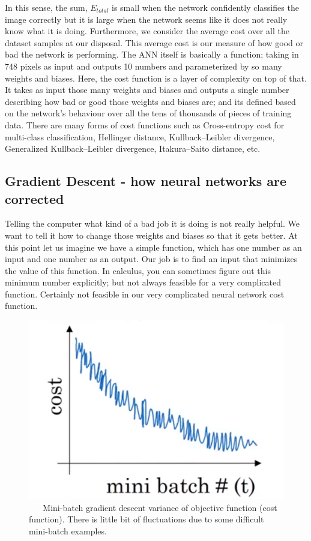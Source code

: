 \documentclass[master]{thesis-uestc}
\begin{document}
In this sense, the sum, $E_{total}$ is small when the network confidently classifies the image correctly but it is large when the network seems like it does not really know what it is doing. Furthermore, we consider the average cost over all the dataset samples at our disposal. This average cost is our measure of how good or bad the network is performing. The ANN itself is basically a function; taking in 748 pixels as input and outputs 10 numbers and parameterized by so many weights and biases. Here, the cost function is a layer of complexity on top of that. It takes as input those many weights and biases and outputs a single number describing how bad or good those weights and biases are; and its defined based on the network's behaviour over all the tens of thousands of pieces of training data. There are many forms of cost functions such as Cross-entropy cost\cite{deBoer2005} for multi-class classification, Hellinger distance\cite{Nikulin2018}, Kullback–Leibler divergence\cite{kullback1951}, Generalized Kullback–Leibler divergence\cite{4655451}, Itakura–Saito distance\cite{NOZAKI201763}, etc.

\subsection{Gradient Descent - how neural networks are corrected}
Telling the computer what kind of a bad job it is doing is not really helpful. We want to tell it how to change those weights and biases so that it gets better. At this point let us imagine we have a simple function, which has one number as an input and one number as an output. Our job is to find an input that minimizes the value of this function. In calculus, you can sometimes figure out this minimum number explicitly; but not always feasible for a very complicated function. Certainly not feasible in our very complicated neural network cost function. 

\begin{figure}[ht]
\includegraphics[width=5in]{pic/mini-batch.PNG}
\caption{\,\,\,\,\,\,\,\,\,\,Mini-batch gradient descent variance of objective function (cost function). There is little bit of fluctuations due to some difficult mini-batch examples.}
\label{mini-batch}
\end{figure}
\end{document}

